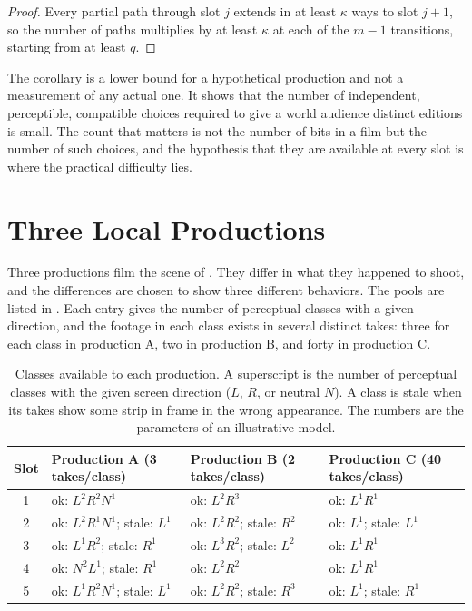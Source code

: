 \documentclass[11pt,twoside,openright]{book}
\theoremstyle{plain}
\theoremstyle{definition}
\theoremstyle{remark}
\begin{document}
\begin{proof}
Every partial path through slot $j$ extends in at least $\kappa$ ways to slot $j+1$, so the number of paths multiplies by at least $\kappa$ at each of the $m-1$ transitions, starting from at least $q$.
\end{proof}

The corollary is a lower bound for a hypothetical production and not a measurement of any actual one. It shows that the number of independent, perceptible, compatible choices required to give a world audience distinct editions is small. The count that matters is not the number of bits in a film but the number of such choices, and the hypothesis that they are available at every slot is where the practical difficulty lies.

\section{Three Local Productions}\label{sec:productions}

Three productions film the scene of . They differ in what they happened to shoot, and the differences are chosen to show three different behaviors. The pools are listed in . Each entry gives the number of perceptual classes with a given direction, and the footage in each class exists in several distinct takes: three for each class in production A, two in production B, and forty in production C.

\begin{table}[ht]
\centering
\small
\begin{tabular}{@{}c l l l@{}}
\toprule
Slot & Production A (3 takes/class) & Production B (2 takes/class) & Production C (40 takes/class)\\
\midrule
1 & ok: $L^2R^2N^1$ & ok: $L^2R^3$ & ok: $L^1R^1$\\
2 & ok: $L^2R^1N^1$; stale: $L^1$ & ok: $L^2R^2$; stale: $R^2$ & ok: $L^1$; stale: $L^1$\\
3 & ok: $L^1R^2$; stale: $R^1$ & ok: $L^3R^2$; stale: $L^2$ & ok: $L^1R^1$\\
4 & ok: $N^2L^1$; stale: $R^1$ & ok: $L^2R^2$ & ok: $L^1R^1$\\
5 & ok: $L^1R^2N^1$; stale: $L^1$ & ok: $L^2R^2$; stale: $R^3$ & ok: $L^1$; stale: $R^1$\\
\bottomrule
\end{tabular}
\caption{Classes available to each production. A superscript is the number of perceptual classes with the given screen direction ($L$, $R$, or neutral $N$). A class is stale when its takes show some strip in frame in the wrong appearance. The numbers are the parameters of an illustrative model.}\label{tab:pools}
\end{table}
\end{document}
